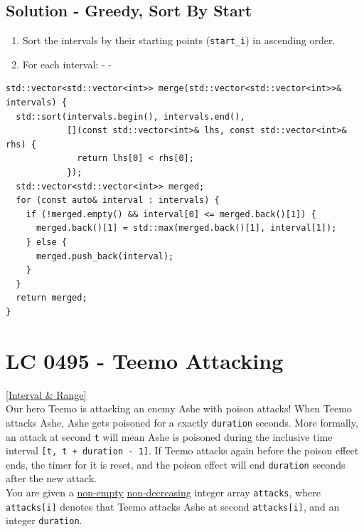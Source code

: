 \subsection*{Solution - Greedy, Sort By Start}
\begin{enumerate}
\item Sort the intervals by their starting points ({\colorbox{CodeBackground}{\lstinline|start_i|}}) in ascending order.
\item For each interval:
  \subitem - {\color{magenta}{If the current interval does not overlap with the previous one, simply add the current interval.}}
  \subitem - {\color{magenta}{If there is an overlap, merge the current interval with the previous one.}}
\end{enumerate}
\begin{lstlisting}
std::vector<std::vector<int>> merge(std::vector<std::vector<int>>& intervals) {
  std::sort(intervals.begin(), intervals.end(),
            [](const std::vector<int>& lhs, const std::vector<int>& rhs) {
              return lhs[0] < rhs[0];
            });
  std::vector<std::vector<int>> merged;
  for (const auto& interval : intervals) {
    if (!merged.empty() && interval[0] <= merged.back()[1]) {
      merged.back()[1] = std::max(merged.back()[1], interval[1]);
    } else {
      merged.push_back(interval);
    }
  }
  return merged;
}
\end{lstlisting}

\section{LC 0495 - Teemo Attacking}\label{lc0495}
\hyperref[sec:interval_range]{[Interval \& Range]}\\

Our hero Teemo is attacking an enemy Ashe with poison attacks! When Teemo attacks Ashe, Ashe gets poisoned for a exactly {\colorbox{CodeBackground}{\lstinline|duration|}} seconds. More formally, an attack at second {\colorbox{CodeBackground}{\lstinline|t|}} will mean Ashe is poisoned during the inclusive time interval {\colorbox{CodeBackground}{\lstinline|[t, t + duration - 1]|}}. If Teemo attacks again before the poison effect ends, the timer for it is reset, and the poison effect will end {\colorbox{CodeBackground}{\lstinline|duration|}} seconds after the new attack.\\

You are given a \ul{non-empty} \ul{non-decreasing} integer array {\colorbox{CodeBackground}{\lstinline|attacks|}}, where {\colorbox{CodeBackground}{\lstinline|attacks[i]|}} denotes that Teemo attacks Ashe at second {\colorbox{CodeBackground}{\lstinline|attacks[i]|}}, and an integer {\colorbox{CodeBackground}{\lstinline|duration|}}.\\

